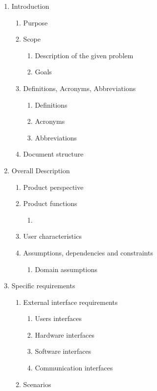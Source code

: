 \documentclass{article}
\begin{document}
	\begin{enumerate}
			\item Introduction
			\begin{enumerate}
				\item Purpose
				\item Scope
				\begin{enumerate}
					\item Description of the given problem
					\item Goals
				\end{enumerate}
				\item Definitions, Acronyms, Abbreviations
				\begin{enumerate}
					\item Definitions
					\item Acronyms
					\item Abbreviations
				\end{enumerate}
				\item Document structure
			\end{enumerate}
			\item Overall Description
			\begin{enumerate}
				\item Product perspective
				\item Product functions
				\begin{enumerate}
					\item 
				\end{enumerate}
				\item User characteristics
				\item Assumptions, dependencies and constraints
				\begin{enumerate}
					\item Domain assumptions
				\end{enumerate}
			\end{enumerate}
			\item Specific requirements
			\begin{enumerate}
				\item External interface requirements	
				\begin{enumerate}
					\item Users interfaces
					\item Hardware interfaces
					\item Software interfaces
					\item Communication interfaces
				\end{enumerate}
				\item Scenarios

\end{enumerate}
\end{enumerate}
\end{document}
